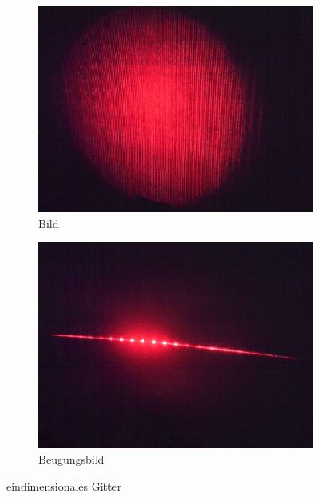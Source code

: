\begin{figure}[p]
	\centering
	\begin{subfigure}{0.49\textwidth}
		\includegraphics[width=\textwidth]{data/optics/04_Gitter_1D}
		\caption{Bild}
	\end{subfigure}
	\begin{subfigure}{0.49\textwidth}
		\includegraphics[width=\textwidth]{data/optics/04_Gitter_1D_Beugung}
		\caption{Beugungsbild} 		\label{fig:Gitter_BG}
	\end{subfigure}
	\caption{eindimensionales Gitter}		\label{fig:Gitter}
	\vspace{-1em}
\end{figure}

